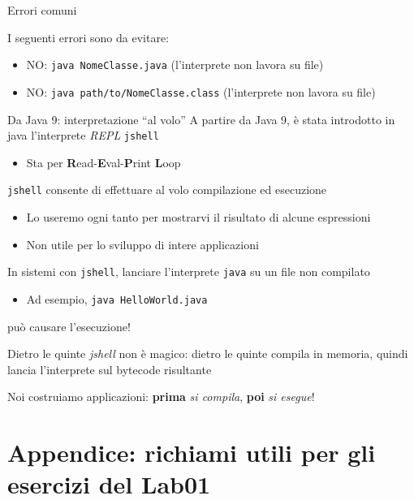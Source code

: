 \documentclass[xcolor=dvipsnames,presentation]{beamer}
\begin{document}
\begin{frame}{Errori comuni}

I seguenti errori sono da evitare:
\begin{itemize}
\item NO: \texttt{java NomeClasse.java} (l'interprete non lavora su file)
\item NO: \texttt{java path/to/NomeClasse.class} (l'interprete non lavora su file)
\end{itemize}

\end{frame}

\begin{frame}{Da Java 9: interpretazione ``al volo''}
    A partire da Java 9, è stata introdotto in java l'interprete \textit{REPL} \texttt{jshell}
    \begin{itemize}
        \item Sta per \textbf{R}ead-\textbf{E}val-\textbf{P}rint \textbf{L}oop
    \end{itemize}
    \texttt{jshell} consente di effettuare al volo compilazione ed esecuzione
    \begin{itemize}
        \item Lo useremo ogni tanto per mostrarvi il risultato di alcune espressioni
        \item Non utile per lo sviluppo di intere applicazioni
    \end{itemize}
    In sistemi con \texttt{jshell}, lanciare l'interprete \texttt{java} su un file non compilato
    \begin{itemize}
        \item Ad esempio, \texttt{java HelloWorld.java}
    \end{itemize}
    può causare l'esecuzione!
    \begin{block}{Dietro le quinte}
        \textit{jshell} non è magico: dietro le quinte compila in memoria, quindi lancia l'interprete sul bytecode risultante
    \end{block}
    Noi costruiamo applicazioni: \textbf{prima} \textit{si compila}, \textbf{poi} \textit{si esegue}!
\end{frame}

\section{Appendice: richiami utili per gli esercizi del Lab01}

\end{document}
